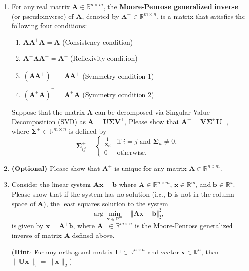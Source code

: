 \documentclass[11pt,letter,notitlepage]{article}
\theoremstyle{definition}
\begin{document}
\newpage
\begin{exercise}
    \begin{enumerate}
    \item 
    For any real matrix $\mathbf{A}\in\mathbb{R}^{n\times m}$, the \textbf{Moore-Penrose generalized inverse} (or pseudoinverse) of $\mathbf{A}$, denoted by $\mathbf{A}^+\in\mathbb{R}^{m\times n}$, is a matrix that satisfies the following four conditions:

        \begin{enumerate}
            \item $\mathbf{A}\mathbf{A}^+\mathbf{A} = \mathbf{A}$ \hfill (Consistency condition)
            \item $\mathbf{A}^+\mathbf{A}\mathbf{A}^+ = \mathbf{A}^+$ \hfill (Reflexivity condition)
            \item $(\mathbf{A}\mathbf{A}^+)^\top = \mathbf{A}\mathbf{A}^+$ \hfill (Symmetry condition 1)
            \item $(\mathbf{A}^+\mathbf{A})^\top = \mathbf{A}^+\mathbf{A}$ \hfill (Symmetry condition 2)
        \end{enumerate}
    Suppose that the matrix \( \mathbf{A} \) can be decomposed via Singular Value Decomposition (SVD) as \( \mathbf{A} = \mathbf{U}\boldsymbol{\Sigma} \mathbf{V}^\top \), Please show that $\mathbf{A}^+ = \mathbf{V}\boldsymbol\Sigma^{+} \mathbf{U}^\top$, where $ \boldsymbol \Sigma^+ \in\mathbb{R}^{m\times n} $ is defined by:
    \[
    \boldsymbol\Sigma^+_{ij} = 
    \begin{cases} 
    \frac{1}{\boldsymbol\Sigma_{ii}} & \text{if } i = j \text{ and } \boldsymbol \Sigma_{ii} \neq 0, \\
    0 & \text{otherwise}.
    \end{cases}
    \]
    
    
    \item \textbf{(Optional)} Please show that $\mathbf{A}^+$ is unique for any matrix $\mathbf{A}\in\mathbb{R}^{n\times m}$.

    \item Consider the linear system $\mathbf{A}\mathbf{x} = \mathbf{b}$ where $\mathbf{A}\in\mathbb{R}^{n\times m}$, $\mathbf{x} \in \mathbb{R}^m$, and $\mathbf{b} \in \mathbb{R}^n$. Please show that if the system has no solution (i.e., $\mathbf{b}$ is not in the column space of $\mathbf{A}$), the least squares solution to the system
    $$
	\arg \min_{\mathbf{x}\in\mathbb{R}^m}\quad \Vert \mathbf{A}\mathbf{x} - \mathbf b \Vert_2^2,
    $$
    is given by $\mathbf{x} = \mathbf A^ + \mathbf b$, where $\mathbf{A}^+\in\mathbb{R}^{m\times n}$ is the Moore-Penrose generalized inverse of matrix $\mathbf{A}$ defined above.

    (\textbf{Hint}: For any orthogonal matrix $\mathbf{U}\in\mathbb{R}^{n\times n}$ and vector $\mathbf{x}\in\mathbb{R}^n$, then $\|\mathbf{U}\mathbf{x}\|_2 = \|\mathbf{x}\|_2$)
\end{enumerate}
\end{exercise}
\end{document}
